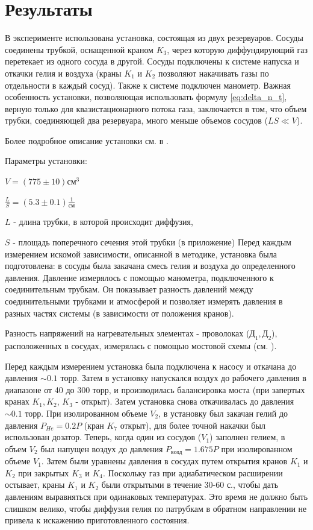 \section{Результаты}
В эксперименте использована установка, состоящая из двух резервуаров. Сосуды соединены трубкой, оснащенной краном $K_3$, через которую диффундирующий газ перетекает из одного сосуда в другой. Сосуды подключены к системе напуска и откачки гелия и воздуха (краны $K_1$ и $K_2$ позволяют накачивать газы по отдельности в каждый сосуд). Также к системе подключен манометр. Важная особенность установки, позволяющая использовать формулу \eqref{eq:delta_n_t}, верную только для квазистационарного потока газа, заключается в том, что объем трубки, соединяющей два резервуара, много меньше объемов сосудов ($LS\ll V$).

Более подробное описание установки см. в .

Параметры установки:
\begin{center}
    $V= (775 \pm 10)\text{см}^3$
    
    $\frac{L}{S} = (5.3 \pm 0.1)\frac{1}{\text{см}}$

   
\end{center}
 $L$ - длина трубки, в которой происходит диффузия,

 $S$ - площадь поперечного сечения этой трубки
 (в приложение)
Перед каждым измерением искомой зависимости, описанной в методике, установка была подготовлена: в сосуды была закачана смесь гелия и воздуха до определенного давления. Давление измерялось с помощью манометра, подключенного к соединительным трубкам. Он показывает разность давлений между соединительными трубками и атмосферой и позволяет измерять давления в разных частях системы (в зависимости от положения кранов).

Разность напряжений на нагревательных элементах - проволоках ($\text{Д}_1, \text{Д}_2$), расположенных в сосудах, измерялась с помощью мостовой схемы (см. ).


Перед каждым измерением установка была подключена к насосу и откачана до давления $\sim 0.1$ торр. Затем в установку напускался воздух до рабочего давления в диапазоне от 40 до 300 торр, и производилась балансировка моста (при запертых кранах $K_1, K_2$, $K_3$ - открыт). Затем установка снова откачивалась до давления $\sim 0.1$ торр. При изолированном объеме $V_2$, в установку был закачан гелий до давления $P_{He} = 0.2P$ (кран $K_7$ открыт), для более точной накачки был использован дозатор. Теперь, когда один из сосудов ($V_1$) заполнен гелием, в объем $V_2$ был напущен воздух до давления $P_{возд}=1.675P$ при изолированном объеме $V_1$. Затем были уравнены давления в сосудах путем открытия кранов $K_1$ и $K_2$ при закрытых $K_3$ и $K_4$. Поскольку газ при адиабатическом расширении остывает, краны $K_1$ и $K_2$ были открытыми в течение 30-60 с., чтобы дать давлениям выравняться при одинаковых температурах. Это время не должно быть слишком велико, чтобы диффузия гелия по патрубкам в обратном направлении не привела к искажению приготовленного состояния.

